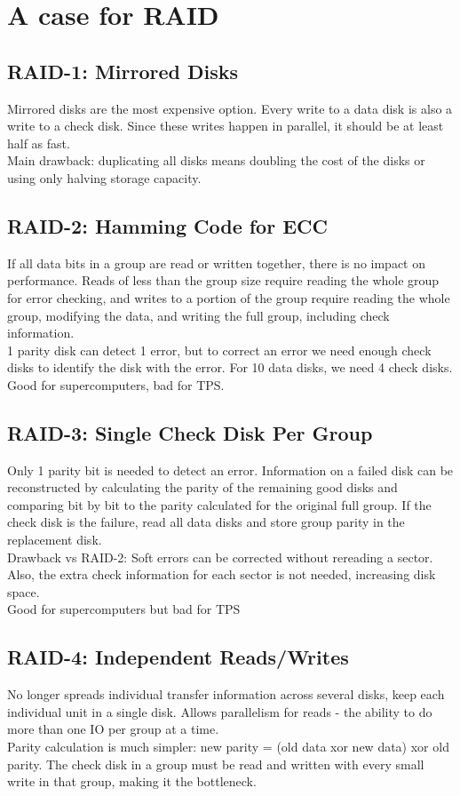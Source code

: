 \vskip 0.5cm


\section{A case for RAID}
\subsection{RAID-1: Mirrored Disks}
Mirrored disks are the most expensive option. Every write to a data disk is also a write to a check disk. Since these writes happen in parallel, it should be at least half as fast.\\
Main drawback: duplicating all disks means doubling the cost of the disks or using only halving storage capacity.
\subsection{RAID-2: Hamming Code for ECC}
If all data bits in a group are read or written together, there is no impact on performance. Reads of less than the group size require reading the whole group for error checking, and writes to a portion of the group require reading the whole group, modifying the data, and writing the full group, including check information.\\
1 parity disk can detect 1 error, but to correct an error we need enough check disks to identify the disk with the error. For 10 data disks, we need 4 check disks.\\
Good for supercomputers, bad for TPS.
\subsection{RAID-3: Single Check Disk Per Group}
Only 1 parity bit is needed to detect an error. Information on a failed disk can be reconstructed by calculating the parity of the remaining good disks and comparing bit by bit to the parity calculated for the original full group. If the check disk is the failure, read all data disks and store group parity in the replacement disk.\\
Drawback vs RAID-2: Soft errors can be corrected without rereading a sector. Also, the extra check information for each sector is not needed, increasing disk space.\\
Good for supercomputers but bad for TPS
\subsection{RAID-4: Independent Reads/Writes}
No longer spreads individual transfer information across several disks, keep each individual unit in a single disk. Allows parallelism for reads - the ability to do more than one IO per group at a time.\\
Parity calculation is much simpler: new parity = (old data xor new data) xor old parity. The check disk in a group must be read and written with every small write in that group, making it the bottleneck.
